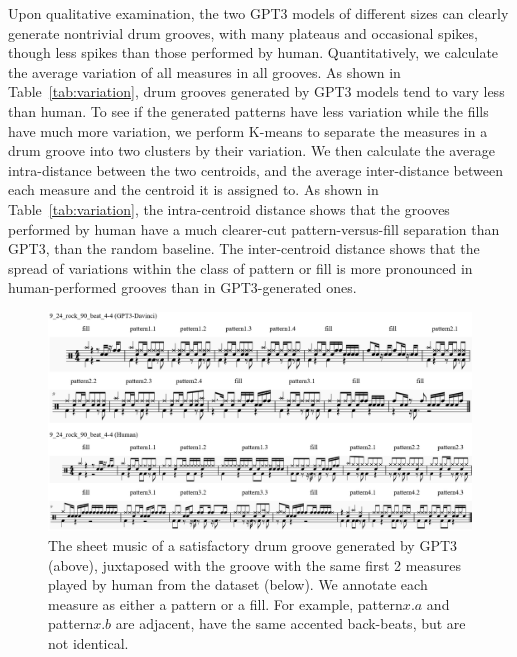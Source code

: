\documentclass[letterpaper]{article} %
\begin{document}
Upon qualitative examination, the two GPT3 models of different sizes can clearly generate nontrivial drum grooves, with many plateaus and occasional spikes, though less spikes than those performed by human. Quantitatively, we calculate the average variation of all measures in all grooves. As shown in Table~\ref{tab:variation}, drum grooves generated by GPT3 models tend to vary less than human. To see if the generated patterns have less variation while the fills have much more variation, we perform K-means to separate the measures in a drum groove into two clusters by their variation. We then calculate the average intra-distance between the two centroids, and the average inter-distance between each measure and the centroid it is assigned to. As shown in Table~\ref{tab:variation}, the intra-centroid distance shows that the grooves performed by human have a much clearer-cut pattern-versus-fill separation than GPT3, than the random baseline. The inter-centroid distance shows that the spread of variations within the class of pattern or fill is more pronounced in human-performed grooves than in GPT3-generated ones.

\begin{figure}
    \centering
    \includegraphics[scale=0.63]{images/good_example.png}
    \caption{The sheet music of a satisfactory drum groove generated by GPT3 (above), juxtaposed with the groove with the same first 2 measures played by human from the dataset (below). We annotate each measure as either a pattern or a fill. For example, pattern$x$.$a$ and pattern$x$.$b$ are adjacent, have the same accented back-beats, but are not identical.}
    \label{fig:good_example}
\end{figure}
\end{document}
